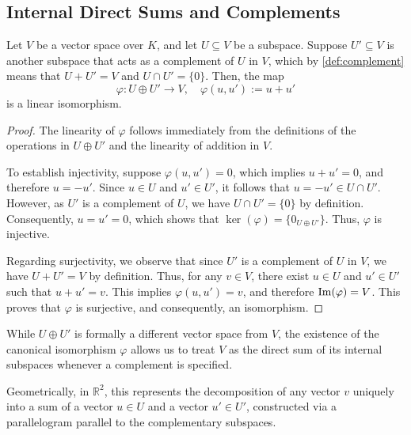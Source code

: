 \subsection{Internal Direct Sums and Complements}

\begin{proposition}
  \label{prop:direct_sum_complement}
  Let $V$ be a vector space over $K$, and let $U \subseteq V$ be a subspace. Suppose $U' \subseteq V$ is another subspace that acts as a complement of $U$ in $V$, which by \cref{def:complement} means that $U + U' = V$ and $U \cap U' = \{0\}$. Then, the map
  \[
  \varphi \colon U \oplus U' \to V, \quad \varphi(u, u') := u + u'
  \]
  is a linear isomorphism.
\end{proposition}

\begin{proof}
  The linearity of $\varphi$ follows immediately from the definitions of the operations in $U \oplus U'$ and the linearity of addition in $V$.

  To establish injectivity, suppose $\varphi(u, u') = 0$, which implies $u + u' = 0$, and therefore $u = -u'$. Since $u \in U$ and $u' \in U'$, it follows that $u = -u' \in U \cap U'$. However, as $U'$ is a complement of $U$, we have $U \cap U' = \{0\}$ by definition. Consequently, $u = u' = 0$, which shows that $\ker(\varphi) = \{0_{U \oplus U'}\}$. Thus, $\varphi$ is injective.

  Regarding surjectivity, we observe that since $U'$ is a complement of $U$ in $V$, we have $U + U' = V$ by definition. Thus, for any $v \in V$, there exist $u \in U$ and $u' \in U'$ such that $u + u' = v$. This implies $\varphi(u, u') = v$, and therefore $\operatorname{Im}(\varphi) = V$. This proves that $\varphi$ is surjective, and consequently, an isomorphism.
\end{proof}

\begin{remark}
  While $U \oplus U'$ is formally a different vector space from $V$, the existence of the canonical isomorphism $\varphi$ allows us to treat $V$ as the direct sum of its internal subspaces whenever a complement is specified.
\end{remark}

Geometrically, in $\mathbb{R}^2$, this represents the decomposition of any vector $v$ uniquely into a sum of a vector $u \in U$ and a vector $u' \in U'$, constructed via a parallelogram parallel to the complementary subspaces.

